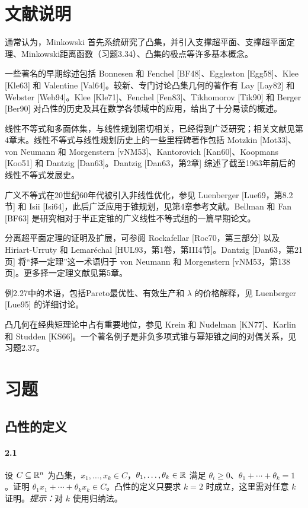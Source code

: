 \section*{文献说明}
通常认为，Minkowski 首先系统研究了凸集，并引入支撑超平面、支撑超平面定理、Minkowski距离函数（习题3.34）、凸集的极点等许多基本概念。

一些著名的早期综述包括 Bonnesen 和 Fenchel [BF48]、Eggleston [Egg58]、Klee [Kle63] 和 Valentine [Val64]。较新、专门讨论凸集几何的著作有 Lay [Lay82] 和 Webster [Web94]。Klee [Kle71]、Fenchel [Fen83]、Tikhomorov [Tik90] 和 Berger [Ber90] 对凸性的历史及其在数学各领域中的应用，给出了十分易读的概述。

线性不等式和多面体集，与线性规划密切相关，已经得到广泛研究；相关文献见第4章末。线性不等式与线性规划历史上的一些里程碑著作包括 Motzkin [Mot33]、von Neumann 和 Morgenstern [vNM53]、Kantorovich [Kan60]、Koopmans [Koo51] 和 Dantzig [Dan63]。Dantzig [Dan63，第2章] 综述了截至1963年前后的线性不等式发展史。

广义不等式在20世纪60年代被引入非线性优化，参见 Luenberger [Lue69，第8.2节] 和 Isii [Isi64]，此后广泛应用于锥规划，见第4章参考文献。Bellman 和 Fan [BF63] 是研究相对于半正定锥的广义线性不等式组的一篇早期论文。

分离超平面定理的证明及扩展，可参阅 Rockafellar [Roc70，第三部分] 以及 Hiriart-Urruty 和 Lemar\'echal [HUL93，第1卷，第III4节]。Dantzig [Dan63，第21页] 将“择一定理”这一术语归于 von Neumann 和 Morgenstern [vNM53，第138页]。更多择一定理文献见第5章。

例2.27中的术语，包括Pareto最优性、有效生产和 $\lambda$ 的价格解释，见 Luenberger [Lue95] 的详细讨论。

凸几何在经典矩理论中占有重要地位，参见 Krein 和 Nudelman [KN77]、Karlin 和 Studden [KS66]。一个著名例子是非负多项式锥与幂矩锥之间的对偶关系，见习题2.37。

\section*{习题}
\subsection*{凸性的定义}
\paragraph{2.1}
设 $C\subseteq\mathbb R^n$ 为凸集，$x_1,\ldots,x_k\in C$，$\theta_1,\ldots,\theta_k\in\mathbb R$ 满足 $\theta_i\ge0$、$\theta_1+\cdots+\theta_k=1$。证明 $\theta_1x_1+\cdots+\theta_kx_k\in C$。凸性的定义只要求 $k=2$ 时成立，这里需对任意 $k$ 证明。\emph{提示：}对 $k$ 使用归纳法。

